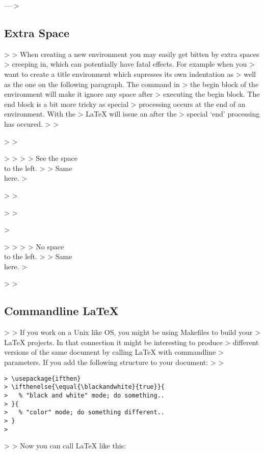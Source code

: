 ---
> \subsection{Extra Space}
> 
> When creating a new environment you may easily get bitten by extra spaces
> creeping in, which can potentially have fatal effects. For example when you
> want to create a title environment which supresses its own indentation as
> well as the one on the following paragraph. The  command in
> the begin block of the environment will make it ignore any space after
> executing the begin block. The end block is a bit more tricky as special
> processing occurs at the end of an environment. With the
>  \LaTeX{} will issue an  after the
> special `end' processing has occured.
> 
> \begin{example}
> \newenvironment{simple}%
>  {\noindent}%
>  {\par\noindent}
> 
> \begin{simple}
> See the space\\to the left.
> \end{simple}
> Same\\here.
> \end{example}
> 
> \begin{example}
> \newenvironment{correct}%
>  {\noindent\ignorespaces}%
>  {\par\noindent%
>    \ignorespacesafterend}
> 
> \begin{correct}
> No space\\to the left.
> \end{correct}
> Same\\here.
> \end{example}
> 
> \subsection{Commandline \LaTeX}
> 
> If you work on a Unix like OS, you might be using Makefiles to build your
> \LaTeX{} projects. In that connection it might be interesting to produce
> different versions of the same document by calling \LaTeX{} with commandline
> parameters. If you add the following structure to your document:
> 
> \begin{verbatim}
> \usepackage{ifthen}
> \ifthenelse{\equal{\blackandwhite}{true}}{
>   % "black and white" mode; do something..
> }{
>   % "color" mode; do something different..
> }
> \end{verbatim}
> 
> Now you can call \LaTeX{} like this:
